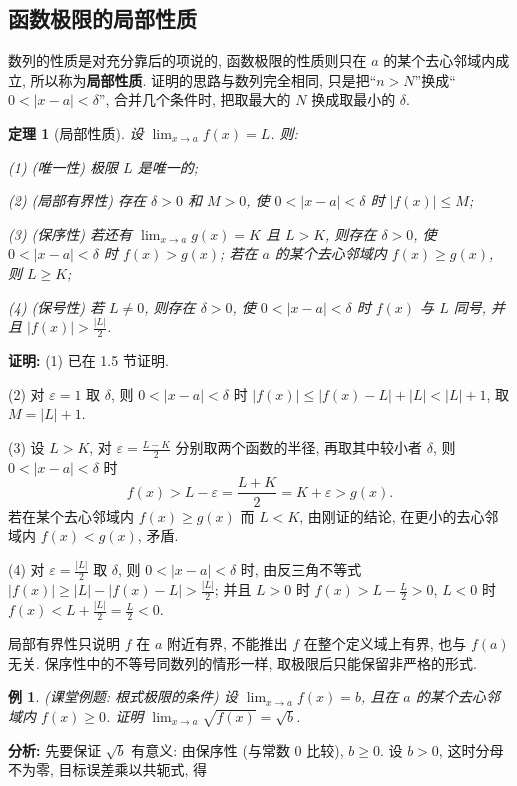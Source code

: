 \documentclass[UTF8,openany]{ctexbook}
\theoremstyle{chinesetextbook}
\newtheorem{example}{例}[section]
\newtheorem{theorem}{定理}[section]
\newenvironment{cnproof}{\par\indent\textbf{证明:} \ignorespaces}{\par}
\begin{document}
\subsection{函数极限的局部性质}
数列的性质是对充分靠后的项说的, 函数极限的性质则只在 $a$ 的某个去心邻域内成立, 所以称为\textbf{局部性质}. 证明的思路与数列完全相同, 只是把“$n>N$”换成“$0<|x-a|<\delta$”, 合并几个条件时, 把取最大的 $N$ 换成取最小的 $\delta$.
\begin{theorem}[局部性质]
设 $\displaystyle\lim_{x\to a}f(x)=L$. 则:

\textup{(1)} (唯一性) 极限 $L$ 是唯一的;

\textup{(2)} (局部有界性) 存在 $\delta>0$ 和 $M>0$, 使 $0<|x-a|<\delta$ 时 $|f(x)|\le M$;

\textup{(3)} (保序性) 若还有 $\displaystyle\lim_{x\to a}g(x)=K$ 且 $L>K$, 则存在 $\delta>0$, 使 $0<|x-a|<\delta$ 时 $f(x)>g(x)$; 若在 $a$ 的某个去心邻域内 $f(x)\ge g(x)$, 则 $L\ge K$;

\textup{(4)} (保号性) 若 $L\ne0$, 则存在 $\delta>0$, 使 $0<|x-a|<\delta$ 时 $f(x)$ 与 $L$ 同号, 并且 $\displaystyle|f(x)|>\frac{|L|}2$.
\end{theorem}
\begin{cnproof}
(1) 已在 1.5 节证明.

(2) 对 $\varepsilon=1$ 取 $\delta$, 则 $0<|x-a|<\delta$ 时 $|f(x)|\le|f(x)-L|+|L|<|L|+1$, 取 $M=|L|+1$.

(3) 设 $L>K$, 对 $\displaystyle\varepsilon=\frac{L-K}2$ 分别取两个函数的半径, 再取其中较小者 $\delta$, 则 $0<|x-a|<\delta$ 时
\[
f(x)>L-\varepsilon=\frac{L+K}2=K+\varepsilon>g(x).
\]
若在某个去心邻域内 $f(x)\ge g(x)$ 而 $L<K$, 由刚证的结论, 在更小的去心邻域内 $f(x)<g(x)$, 矛盾.

(4) 对 $\displaystyle\varepsilon=\frac{|L|}2$ 取 $\delta$, 则 $0<|x-a|<\delta$ 时, 由反三角不等式 $\displaystyle|f(x)|\ge|L|-|f(x)-L|>\frac{|L|}2$; 并且 $L>0$ 时 $\displaystyle f(x)>L-\frac L2>0$, $L<0$ 时 $\displaystyle f(x)<L+\frac{|L|}2=\frac L2<0$.
\end{cnproof}
局部有界性只说明 $f$ 在 $a$ 附近有界, 不能推出 $f$ 在整个定义域上有界, 也与 $f(a)$ 无关. 保序性中的不等号同数列的情形一样, 取极限后只能保留非严格的形式.
\begin{example}\label{ex:k16-1}
\textnormal{(课堂例题: 根式极限的条件)} 设 $\displaystyle\lim_{x\to a}f(x)=b$, 且在 $a$ 的某个去心邻域内 $f(x)\ge0$. 证明 $\displaystyle\lim_{x\to a}\sqrt{f(x)}=\sqrt b$.
\end{example}
\par\indent\textbf{分析:} 先要保证 $\sqrt b$ 有意义: 由保序性 (与常数 $0$ 比较), $b\ge0$. 设 $b>0$, 这时分母不为零, 目标误差乘以共轭式, 得
\end{document}
